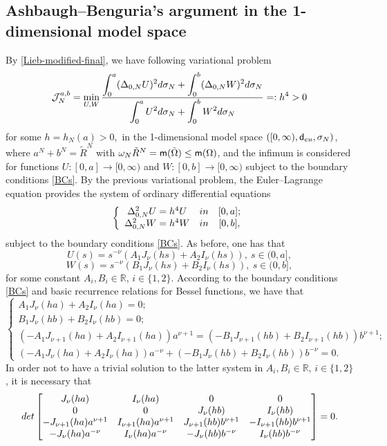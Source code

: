 \documentclass[11pt, reqno]{amsart}
\newcommand{\ds}{\displaystyle}
\numberwithin{equation}{section}
\begin{document}
	\subsection{Ashbaugh--Benguria's argument in the 1-dimensional model space}	By \eqref{Lieb-modified-final}, we have following variational problem  
		$$\mathcal J^{a,b}_N=\min_{U,W} \frac{\displaystyle\int_{0}^a (\Delta_{0,N}U)^2{\rm d}\sigma_N+ \int_{0}^b (\Delta_{0,N}W)^2{\rm d}\sigma_N }{\displaystyle\int_{0}^aU^2 {\rm d}\sigma_N+\int_{0}^b W^2 {\rm d}\sigma_N}=:h^4>0$$ for some $h=h_N(a)>0,$
		in the 1-dimensional model space $([0,\infty),{\sf d}_{\rm eu},\sigma_N)$, where $a^N+b^N=\tilde R^N$ with $\omega_N\tilde R^N={\sf m}(\tilde \Omega)\leq {\sf m}(\Omega)$, and the infimum is considered for functions 
		$U:[0,a]\to [0,\infty)$ and $W:[0,b]\to [0,\infty)$  subject to the boundary 
		conditions \eqref{BCs}. 
		By the previous variational problem, the Euler--Lagrange equation provides the  system of ordinary differential equations
		$$\ds\left\{ \begin{array}{ccc}
			\Delta_{0,N}^2 U=h^4 U & {\rm in} & [0,a]; \\
			\Delta_{0,N}^2 W=h^4 W & {\rm in} &  [0,b],
		\end{array}\right.$$
		subject to the boundary conditions \eqref{BCs}.  As before, one has that
		$$U(s)=s^{-\nu}(A_1J_\nu(hs)+A_2I_\nu(hs)),\ s\in(0,a],$$
		$$W(s)=s^{-\nu}(B_1J_\nu(hs)+B_2I_\nu(hs)),\ s\in(0,b],$$
		for some constant $A_i,B_i\in \mathbb R$, $i\in \{1,2\}.$ According to the boundary conditions \eqref{BCs} and basic recurrence relations for Bessel functions, we have that 
		$$\ds\left\{ \begin{array}{lll}
			A_1J_\nu(ha)+A_2I_\nu(ha)=0; \\
			B_1J_\nu(hb)+B_2I_\nu(hb)=0;\\
			(-A_1J_{\nu+1}(ha)+A_2I_{\nu+1}(ha))a^{\nu+1}=(-B_1J_{\nu+1}(hb)+B_2I_{\nu+1}(hb))b^{\nu+1};\\
			(-A_1J_\nu(ha)+A_2I_\nu(ha))a^{-\nu}+(-B_1J_\nu(hb)+B_2I_\nu(hb))b^{-\nu}=0.
		\end{array}\right.
		$$
		In order not to have a trivial solution to the latter system in $A_i,B_i\in \mathbb R$, $i\in \{1,2\}$, it is necessary that
		\begin{equation}\label{determinant}
			{\rm det}\left[\begin{matrix}
				J_\nu(ha) & I_\nu(ha) & 0 & 0\\
				0 & 0 &J_\nu(hb) & I_\nu(hb)\\
				-J_{\nu+1}(ha)a^{\nu+1} & I_{\nu+1}(ha)a^{\nu+1} &J_{\nu+1}(hb)b^{\nu+1} &-I_{\nu+1}(hb)b^{\nu+1}\\
				-J_{\nu}(ha)a^{-\nu} & I_{\nu}(ha)a^{-\nu} &-J_{\nu}(hb)b^{-\nu} &I_{\nu}(hb)b^{-\nu}
			\end{matrix}\right]=0.
		\end{equation}
\end{document}
